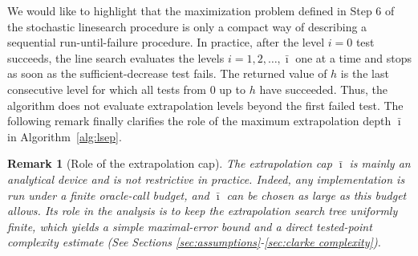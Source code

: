 \documentclass[11pt,a4paper]{article}
\newtheorem{remark}{Remark}[section]
\newcommand{\Imax}{\bar{\imath}}%
\newcommand{\Dexp}{p}
\newcommand{\sara}[1]{{\color{red}{\textbf{[SS: #1]}}\color{black}}}
\begin{document}
\noindent
We  would like to highlight that the maximization problem defined in Step 6 of the stochastic linesearch procedure is only a compact way of describing a sequential run-until-failure procedure.
In practice, after the level \(i=0\) test succeeds, the line search evaluates the
levels \(i=1,2,\ldots,\Imax\) one at a time and stops as soon as the
sufficient-decrease test fails. The returned value of \(h\) is the last
consecutive level for which all tests from \(0\) up to \(h\) have succeeded.
Thus, the algorithm does not evaluate extrapolation levels beyond the first
failed test.  The following remark finally clarifies the role of the maximum extrapolation depth
\(\Imax\) in Algorithm~\ref{alg:lsep}.


\begin{remark}[Role of the extrapolation cap]
The extrapolation cap \(\Imax\) is mainly an analytical device and is not
restrictive in practice. Indeed, any implementation is run under a finite
oracle-call budget, and \(\Imax\) can be chosen as large as this
budget allows. Its role in the analysis is to keep the extrapolation search
tree uniformly finite, which yields a simple maximal-error bound and a direct
tested-point complexity estimate (See Sections \ref{sec:assumptions}-\ref{sec:clarke complexity}).
\end{remark}





\end{document}

